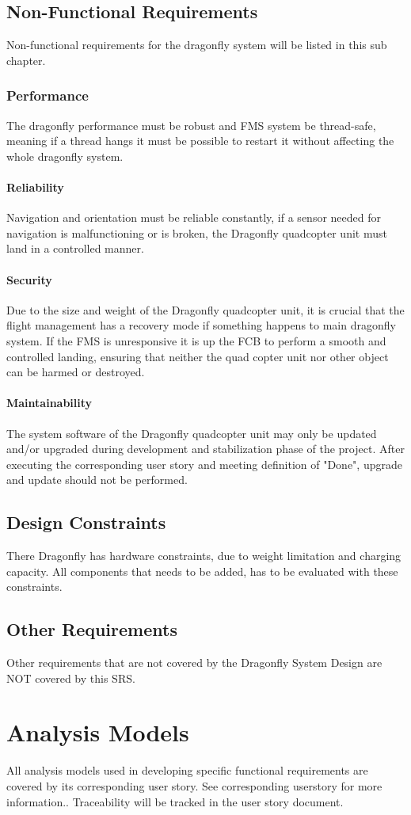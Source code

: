 \documentclass[a4paper]{article}
\begin{document}
\subsection{Non-Functional Requirements}
Non-functional requirements for the dragonfly system will be listed in this sub chapter.

\subsubsection{Performance}
The dragonfly performance must be robust and FMS system be thread-safe, meaning if a thread hangs it must be possible to restart it without affecting the whole dragonfly system.
\paragraph{Reliability}
Navigation and orientation must be reliable constantly, if a sensor needed for navigation is malfunctioning or is broken, the Dragonfly quadcopter unit must land in a controlled manner.
\paragraph{Security}
Due to the size and weight of the Dragonfly quadcopter unit, it is crucial that the flight management has a recovery mode if something happens to main dragonfly system. If the FMS is unresponsive it is up the FCB to perform a smooth and controlled landing, ensuring that neither the quad copter unit nor other object can be harmed or destroyed.
\paragraph{Maintainability}
The system software of the Dragonfly quadcopter unit may only be updated and/or upgraded during development and stabilization phase of the project. After executing the corresponding user story and meeting definition of "Done", upgrade and update should not be performed.

\subsection{Design Constraints}
There Dragonfly has hardware constraints, due to weight limitation and charging capacity. All components that needs to be added, has to be evaluated with these constraints.

\subsection{Other Requirements}
Other requirements that are not covered by the Dragonfly System Design are NOT covered by this SRS.

\section{Analysis Models}
All analysis models used in developing specific functional requirements are covered by its corresponding user story.  See corresponding userstory for more information.. Traceability will be tracked in the user story document.
\end{document}
